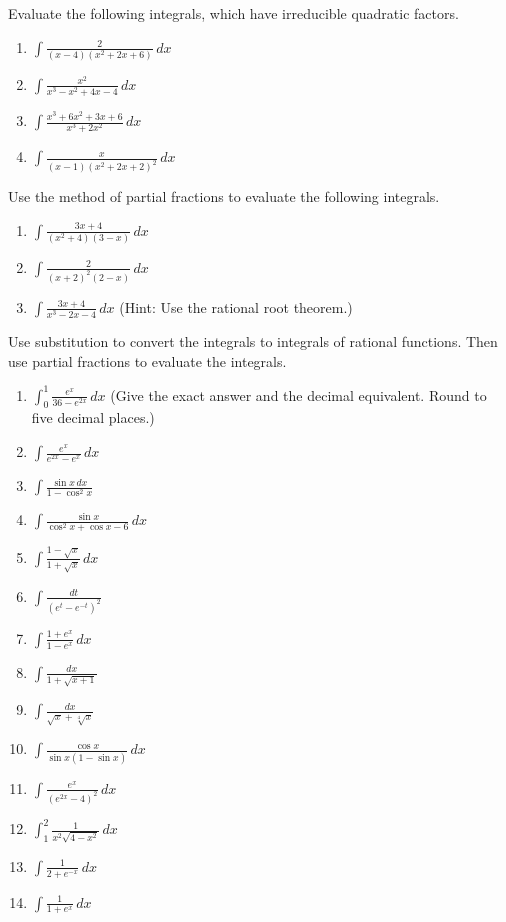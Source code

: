 \documentclass{exercises}
\begin{document}
Evaluate the following integrals, which have irreducible quadratic factors.

\begin{enumerate}[resume]
\item $\int \frac{2}{(x-4)(x^{2}+2x+6)}\,dx$
\item $\int \frac{x^{2}}{x^{3}-x^{2}+4x-4}\,dx$
\item $\int \frac{x^{3}+6x^{2}+3x+6}{x^{3}+2x^{2}}\,dx$
\item $\int \frac{x}{(x-1){(x^{2}+2x+2)}^{2}}\,dx$
\end{enumerate}

Use the method of partial fractions to evaluate the following integrals.

\begin{enumerate}[resume]
\item $\int \frac{3x+4}{(x^{2}+4)(3-x)}\,dx$
\item $\int \frac{2}{{(x+2)}^{2}(2-x)}\,dx$
\item $\int \frac{3x+4}{x^{3}-2x-4}\,dx$ (Hint: Use the rational root theorem.)
\end{enumerate}

Use substitution to convert the integrals to integrals of rational functions. Then use partial fractions to evaluate the integrals.

\begin{enumerate}[resume]
\item $\int_{0}^{1}\frac{e^{x}}{36-e^{2x}}\,dx$ (Give the exact answer and the decimal equivalent. Round to five decimal places.)
\item $\int \frac{e^{x}}{e^{2x}-e^{x}}\,dx$
\item $\int \frac{\sin x\,dx}{1-\cos^{2}x}$
\item $\int \frac{\sin x}{\cos^{2}x+\cos x-6}\,dx$
\item $\int \frac{1-\sqrt{x}}{1+\sqrt{x}}\,dx$
\item $\int \frac{dt}{{(e^{t}-e^{-t})}^{2}}$
\item $\int \frac{1+e^{x}}{1-e^{x}}\,dx$
\item $\int \frac{dx}{1+\sqrt{x+1}}$
\item $\int \frac{dx}{\sqrt{x}+\sqrt[4]{x}}$
\item $\int \frac{\cos x}{\sin x(1-\sin x)}\,dx$
\item $\int \frac{e^{x}}{{(e^{2x}-4)}^{2}}\,dx$
\item $\int_{1}^{2}\frac{1}{x^{2}\sqrt{4-x^{2}}}\,dx$
\item $\int \frac{1}{2+e^{-x}}\,dx$
\item $\int \frac{1}{1+e^{x}}\,dx$
\end{enumerate}
\end{document}
